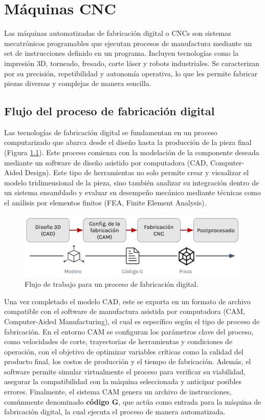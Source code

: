 \chapter{Máquinas CNC}

Las máquinas automatizadas de fabricación digital o CNCs son sistemas mecatrónicos programables que ejecutan procesos de manufactura mediante un set de instrucciones definido en un programa. Incluyen tecnologías como la impresión 3D, torneado, fresado, corte láser y robots industriales. Se caracterizan por su precisión, repetibilidad y autonomía operativa, lo que les permite fabricar piezas diversas y complejas de manera sencilla.

\section{Flujo del proceso de fabricación digital}

Las tecnologías de fabricación digital se fundamentan en un proceso computarizado que abarca desde el diseño hasta la producción de la pieza final (Figura \ref{digfab}). Este proceso comienza con la modelación de la componente deseada mediante un software de diseño asistido por computadora (CAD, Computer-Aided Design). Este tipo de herramientas no solo permite crear y visualizar el modelo tridimensional de la pieza, sino también analizar su integración dentro de un sistema ensamblado y evaluar su desempeño mecánico mediante técnicas como el análisis por elementos finitos (FEA, Finite Element Analysis).

\begin{figure}[h!]
    \centering
    \includegraphics[width=0.9\linewidth]{imgs/digfab.png}
    \caption{Flujo de trabajo para un proceso de fabricación digital.}
    \label{digfab}
\end{figure}

Una vez completado el modelo CAD, este se exporta en un formato de archivo compatible con el software de manufactura asistida por computadora (CAM, Computer-Aided Manufacturing), el cual es específico según el tipo de proceso de fabricación. En el entorno CAM se configuran los parámetros clave del proceso, como velocidades de corte, trayectorias de herramientas y condiciones de operación, con el objetivo de optimizar variables críticas como la calidad del producto final, los costos de producción y el tiempo de fabricación. Además, el software permite simular virtualmente el proceso para verificar su viabilidad, asegurar la compatibilidad con la máquina seleccionada y anticipar posibles errores. Finalmente, el sistema CAM genera un archivo de instrucciones, comúnmente denominado \textbf{código G}, que actúa como entrada para la máquina de fabricación digital, la cual ejecuta el proceso de manera automatizada.

